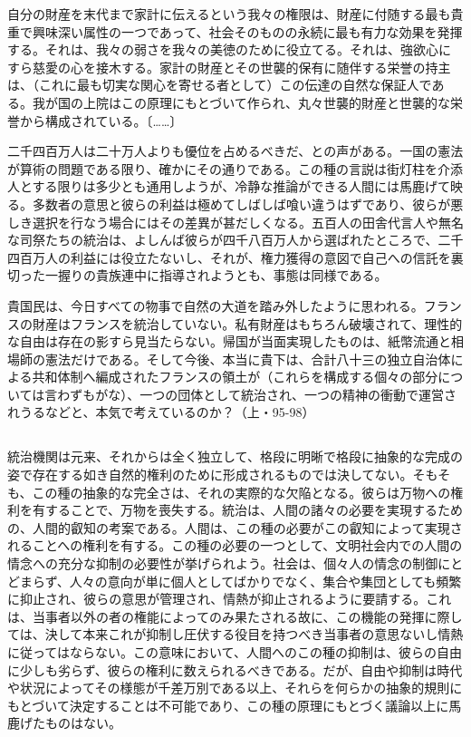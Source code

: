 自分の財産を末代まで家計に伝えるという我々の権限は、財産に付随する最も貴重で興味深い属性の一つであって、社会そのものの永続に最も有力な効果を発揮する。それは、我々の弱さを我々の美徳のために役立てる。それは、強欲心にすら慈愛の心を接木する。家計の財産とその世襲的保有に随伴する栄誉の持主は、（これに最も切実な関心を寄せる者として）この伝達の自然な保証人である。我が国の上院はこの原理にもとづいて作られ、丸々世襲的財産と世襲的な栄誉から構成されている。〔……〕

二千四百万人は二十万人よりも優位を占めるべきだ、との声がある。一国の憲法が算術の問題である限り、確かにその通りである。この種の言説は街灯柱を介添人とする限りは多少とも通用しようが、冷静な推論ができる人間には馬鹿げて映る。多数者の意思と彼らの利益は極めてしばしば喰い違うはずであり、彼らが悪しき選択を行なう場合にはその差異が甚だしくなる。五百人の田舎代言人や無名な司祭たちの統治は、よしんば彼らが四千八百万人から選ばれたところで、二千四百万人の利益には役立たないし、それが、権力獲得の意図で自己への信託を裏切った一握りの貴族連中に指導されようとも、事態は同様である。

貴国民は、今日すべての物事で自然の大道を踏み外したように思われる。フランスの財産はフランスを統治していない。私有財産はもちろん破壊されて、理性的な自由は存在の影すら見当たらない。帰国が当面実現したものは、紙幣流通と相場師の憲法だけである。そして今後、本当に貴下は、合計八十三の独立自治体による共和体制へ編成されたフランスの領土が（これらを構成する個々の部分については言わずもがな）、一つの団体として統治され、一つの精神の衝動で運営されうるなどと、本気で考えているのか？（上・95-98）

\subsection{}



統治機関は元来、それからは全く独立して、格段に明晰で格段に抽象的な完成の姿で存在する如き自然的権利のために形成されるものでは決してない。そもそも、この種の抽象的な完全さは、それの実際的な欠陥となる。彼らは万物への権利を有することで、万物を喪失する。統治は、人間の諸々の必要を実現するための、人間的叡知の考案である。人間は、この種の必要がこの叡知によって実現されることへの権利を有する。この種の必要の一つとして、文明社会内での人間の情念への充分な抑制の必要性が挙げられよう。社会は、個々人の情念の制御にとどまらず、人々の意向が単に個人としてばかりでなく、集合や集団としても頻繁に抑止され、彼らの意思が管理され、情熱が抑止されるように要請する。これは、当事者以外の者の権能によってのみ果たされる故に、この機能の発揮に際しては、決して本来これが抑制し圧伏する役目を持つべき当事者の意思ないし情熱に従ってはならない。この意味において、人間へのこの種の抑制は、彼らの自由に少しも劣らず、彼らの権利に数えられるべきである。だが、自由や抑制は時代や状況によってその様態が千差万別である以上、それらを何らかの抽象的規則にもとづいて決定することは不可能であり、この種の原理にもとづく議論以上に馬鹿げたものはない。

